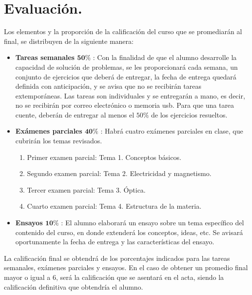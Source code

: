 \documentclass[12pt]{article}
\begin{document}
\section{Evaluación.}
Los elementos y la proporción de la calificación del curso que se promediarán al final, se distribuyen de la siguiente manera:
\begin{itemize}
\item \textbf{Tareas semanales $\mathbf{50\%}$} : Con la finalidad de que el alumno desarrolle la capacidad de solución de problemas, se les proporcionará cada semana, un conjunto de ejercicios que deberá de entregar, la fecha de entrega quedará definida con anticipación, y se avisa que no se recibirán tareas extemporáneas. Las tareas son individuales y se entregarán a mano, es decir, no se recibirán por correo electrónico o memoria usb. Para que una tarea cuente, deberán de entregar al menos el $50\%$ de los ejercicios resueltos. 
\item \textbf{Exámenes parciales $\mathbf{40\%}$} : Habrá cuatro exámenes parciales en clase, que cubrirán los temas revisados.
\begin{enumerate}
\item Primer examen parcial: Tema 1. Conceptos básicos.
\item Segundo examen parcial: Tema 2. Electricidad y magnetismo.
\item Tercer examen parcial: Tema 3. Óptica.
\item Cuarto examen parcial: Tema 4. Estructura de la materia. 
\end{enumerate}
\item \textbf{Ensayos $\mathbf{10\%}$} : El alumno elaborará un ensayo sobre un tema específico del contenido del curso, en donde extenderá los conceptos, ideas, etc. Se avisará oportunamente la fecha de entrega y las características del ensayo.
\end{itemize}
La calificación final se obtendrá de los porcentajes indicados para las tareas semanales, exámenes parciales y ensayos. En el caso de obtener un promedio final mayor o igual a $6$, será la calificación que se asentará en el acta, siendo la calificación definitiva que obtendría el alumno.
\end{document}
